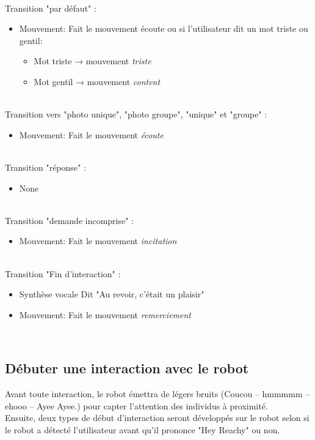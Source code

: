 \ \\
Transition "par défaut" :
\begin{itemize}
    \item Mouvement: Fait le mouvement écoute ou si l'utilisateur dit un mot triste ou gentil: 
        \begin{itemize}
        \item Mot triste → mouvement \textit{triste}
        \item Mot gentil → mouvement \textit{content}
    \end{itemize}
\end{itemize}
\ \\
Transition vers "photo unique", "photo groupe", "unique" et "groupe" :
\begin{itemize}
    \item Mouvement: Fait le mouvement \textit{écoute}
\end{itemize}
\ \\
Transition "réponse" :
\begin{itemize}
    \item None
\end{itemize}
\ \\
Transition "demande incomprise" :
\begin{itemize}
    \item Mouvement: Fait le mouvement \textit{incitation}
\end{itemize}
\ \\
Transition "Fin d'interaction" : 
\begin{itemize}
    \item Synthèse vocale Dit "Au revoir, c'était un plaisir"
    \item Mouvement: Fait le mouvement \textit{remerciement}
\end{itemize}
\ \\

\newpage

\subsection{Débuter une interaction avec le robot}
\label{begin_interact}
Avant toute interaction, le robot émettra de légers bruits (Coucou -- hmmmmm -- ehooo -- Ayee Ayee.) pour capter l'attention des individus à proximité. 
\ \\
Ensuite, deux types de début d'interaction seront développés sur le robot selon si le robot a détecté l'utilisateur avant qu'il prononce "Hey Reachy" ou non.

